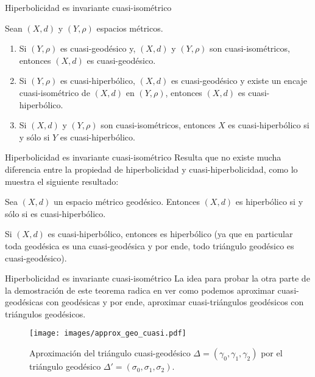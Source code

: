 \documentclass[xcolor=dvipsnames]{beamer}
\theoremstyle{largebreak}
\begin{document}
\begin{frame}{Hiperbolicidad es invariante cuasi-isométrico}
    \begin{propo}
        Sean $(X,d)$ y $(Y,\rho)$ espacios métricos.
        \begin{enumerate}[label = \textit{(\arabic*)}]
            \item Si $(Y,\rho)$ es cuasi-geodésico y, $(X,d)$ y $(Y,\rho)$ son cuasi-isométricos, entonces $(X,d)$ es cuasi-geodésico.
            \item Si $(Y,\rho)$ es cuasi-hiperbólico, $(X,d)$ es cuasi-geodésico y existe un encaje cuasi-isométrico de $(X,d)$ en $(Y,\rho)$, entonces $(X,d)$ es cuasi-hiperbólico.
            \item Si $(X,d)$ y $(Y,\rho)$ son cuasi-isométricos, entonces $X$ es cuasi-hiperbólico si y sólo si $Y$ es cuasi-hiperbólico.
        \end{enumerate}
    \end{propo}
\end{frame}

\begin{frame}{Hiperbolicidad es invariante cuasi-isométrico}
    Resulta que no existe mucha diferencia entre la propiedad de hiperbolicidad y cuasi-hiperbolicidad, como lo muestra el siguiente resultado:
    
    \pause

    \begin{theor}
        Sea $(X,d)$ un espacio métrico geodésico. Entonces $(X,d)$ es hiperbólico si y sólo si es cuasi-hiperbólico.
    \end{theor}

    \pause

    Si $(X,d)$ es cuasi-hiperbólico, entonces es hiperbólico (ya que en particular toda geodésica es una cuasi-geodésica y por ende, todo triángulo geodésico es cuasi-geodésico).

\end{frame}

\begin{frame}{Hiperbolicidad es invariante cuasi-isométrico}
    La idea para probar la otra parte de la demostración de este teorema radica en ver como podemos aproximar cuasi-geodésicas con geodésicas y por ende, aproximar cuasi-triángulos geodésicos con triángulos geodésicos.

    
    \begin{figure}
        \begin{center}
            \texttt{[image: images/approx\_geo\_cuasi.pdf]}
        \end{center}
        \caption{Aproximación del triángulo cuasi-geodésico $\Delta=(\gamma_0,\gamma_1,\gamma_2)$ por el triángulo geodésico $\Delta'=(\sigma_0,\sigma_1,\sigma_2)$.}
    \end{figure}

\end{frame}
\end{document}
